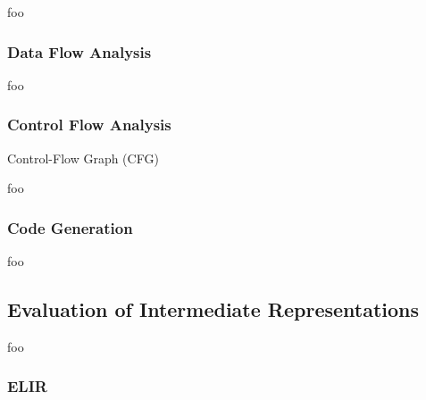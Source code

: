\documentclass[12pt, a4paper]{article}
\begin{document}
foo


\subsubsection{Data Flow Analysis}

foo

\cite{type_decomp}


\subsubsection{Control Flow Analysis}

Control-Flow Graph (CFG)

foo


\subsubsection{Code Generation}

foo


\subsection{Evaluation of Intermediate Representations}



foo


\subsubsection{ELIR}

\end{document}
